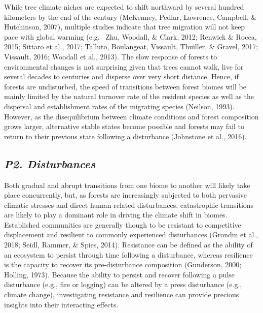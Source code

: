 \documentclass[a4paperpaper,]{article}
\begin{document}
While tree climate niches are expected to shift northward by several
hundred kilometers by the end of the century (McKenney, Pedlar,
Lawrence, Campbell, \& Hutchinson, 2007), multiple studies indicate that
tree migration will not keep pace with global warming (e.g.~ Zhu,
Woodall, \& Clark, 2012; Renwick \& Rocca, 2015; Sittaro et al., 2017;
Talluto, Boulangeat, Vissault, Thuiller, \& Gravel, 2017; Vissault,
2016; Woodall et al., 2013). The slow response of forests to
environmental changes is not surprising given that trees cannot walk,
live for several decades to centuries and disperse over very short
distance. Hence, if forests are undisturbed, the speed of transitions
between forest biomes will be mainly limited by the natural turnover
rate of the resident species as well as the dispersal and establishment
rates of the migrating species (Neilson, 1993). However, as the
disequilibrium between climate conditions and forest composition grows
larger, alternative stable states become possible and forests may fail
to return to their previous state following a disturbance (Johnstone et
al., 2016).

\hypertarget{p2.-disturbances}{%
\subsection{\texorpdfstring{\emph{P2.
Disturbances}}{P2. Disturbances}}\label{p2.-disturbances}}

Both gradual and abrupt transitions from one biome to another will
likely take place concurrently, but, as forests are increasingly
subjected to both pervasive climatic stresses and direct human-related
disturbances, catastrophic transitions are likely to play a dominant
role in driving the climate shift in biomes. Established communities are
generally though to be resistant to competitive displacement and
resilient to commonly experienced disturbances (Grondin et al., 2018;
Seidl, Rammer, \& Spies, 2014). Resistance can be defined as the ability
of an ecosystem to persist through time following a disturbance, whereas
resilience is the capacity to recover its pre-disturbance composition
(Gunderson, 2000; Holling, 1973). Because the ability to persist and
recover following a pulse disturbance (e.g., fire or logging) can be
altered by a press disturbance (e.g., climate change), investigating
resistance and resilience can provide precious insights into their
interacting effects.
\end{document}
